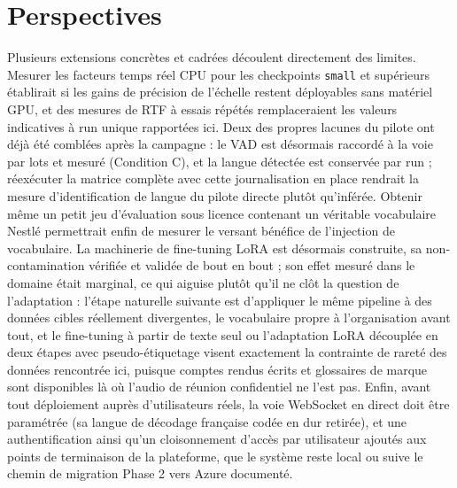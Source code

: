 \documentclass[12pt]{report}
\begin{document}
\section*{Perspectives}
Plusieurs extensions concrètes et cadrées découlent directement des limites. Mesurer les facteurs temps réel CPU pour les checkpoints \texttt{small} et supérieurs établirait si les gains de précision de l'échelle restent déployables sans matériel GPU, et des mesures de RTF à essais répétés remplaceraient les valeurs indicatives à run unique rapportées ici. Deux des propres lacunes du pilote ont déjà été comblées après la campagne : le VAD est désormais raccordé à la voie par lots et mesuré (Condition C), et la langue détectée est conservée par run ; réexécuter la matrice complète avec cette journalisation en place rendrait la mesure d'identification de langue du pilote directe plutôt qu'inférée. Obtenir même un petit jeu d'évaluation sous licence contenant un véritable vocabulaire Nestl\'e permettrait enfin de mesurer le versant bénéfice de l'injection de vocabulaire. La machinerie de fine-tuning LoRA est désormais construite, sa non-contamination vérifiée et validée de bout en bout ; son effet mesuré dans le domaine était marginal, ce qui aiguise plutôt qu'il ne clôt la question de l'adaptation : l'étape naturelle suivante est d'appliquer le même pipeline à des données cibles réellement divergentes, le vocabulaire propre à l'organisation avant tout, et le fine-tuning à partir de texte seul \cite{fang2025textonly} ou l'adaptation LoRA découplée en deux étapes avec pseudo-étiquetage \cite{zheng2026twostage} visent exactement la contrainte de rareté des données rencontrée ici, puisque comptes rendus écrits et glossaires de marque sont disponibles là où l'audio de réunion confidentiel ne l'est pas. Enfin, avant tout déploiement auprès d'utilisateurs réels, la voie WebSocket en direct doit être paramétrée (sa langue de décodage française codée en dur retirée), et une authentification ainsi qu'un cloisonnement d'accès par utilisateur ajoutés aux points de terminaison de la plateforme, que le système reste local ou suive le chemin de migration Phase 2 vers Azure documenté.
\renewcommand{\cftchappresnum}{\chaptername~}
\renewcommand{\cftchapnumwidth}{6em}
\cleardoublepage
\printbibliography[heading=subbibliography,
                    title={\textsc{Bibliographie}}]
\thispagestyle{fancy}
\newpage
\tableofcontents
\thispagestyle{fancy}
\end{document}
